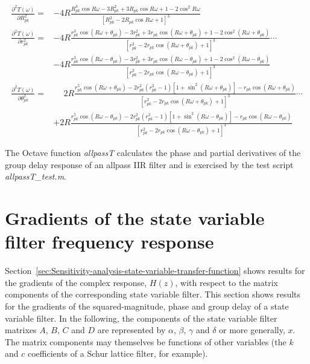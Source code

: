 \documentclass[a4paper,twoside,10pt,english]{report}
\begin{document}
\begin{align*}
\frac{\partial^{2} T\left(\omega\right)}{\partial R_{pk}^{2}} =&
-4R\frac{R_{pk}^{3}\cos R\omega-3R_{pk}^{2}+3R_{pk}\cos R\omega+1-2\cos^{2}R\omega}
{\left[R_{pk}^{2}-2R_{pk}\cos R\omega+1\right]^{3}}\\
\frac{\partial^{2} T\left(\omega\right)}{\partial r_{pk}^{2}} =&
-4R\frac{r_{pk}^{3}\cos\left(R\omega+\theta_{pk}\right)-3r_{pk}^{2}
+3r_{pk}\cos\left(R\omega+\theta_{pk}\right)
+1-2\cos^{2}\left(R\omega+\theta_{pk}\right)}
{\left[r_{pk}^{2}-2r_{pk}\cos\left(R\omega+\theta_{pk}\right)+1\right]^{3}}\cdots\\
&-4R\frac{r_{pk}^{3}\cos\left(R\omega-\theta_{pk}\right)-3r_{pk}^{2}
+3r_{pk}\cos\left(R\omega-\theta_{pk}\right)
+1-2\cos^{2}\left(R\omega-\theta_{pk}\right)}
{\left[r_{pk}^{2}-2r_{pk}\cos\left(R\omega-\theta_{pk}\right)+1\right]^{3}}\\
\frac{\partial^{2} T\left(\omega\right)}{\partial \theta_{pk}^{2}} =&
\phantom{+}2R\frac{r_{pk}^{5}\cos\left(R\omega+\theta_{pk}\right)
-2r_{pk}^{2}\left(r_{pk}^{2}-1\right)
\left[1+\sin^{2}\left(R\omega+\theta_{pk}\right)\right]
-r_{pk}\cos\left(R\omega+\theta_{pk}\right)}
{\left[r_{pk}^{2}-2r_{pk}\cos\left(R\omega+\theta_{pk}\right)+1\right]^{3}}\cdots\\
&+2R\frac{r_{pk}^{5}\cos\left(R\omega-\theta_{pk}\right)
-2r_{pk}^{2}\left(r_{pk}^{2}-1\right)
\left[1+\sin^{2}\left(R\omega-\theta_{pk}\right)\right]
-r_{pk}\cos\left(R\omega-\theta_{pk}\right)}
{\left[r_{pk}^{2}-2r_{pk}\cos\left(R\omega-\theta_{pk}\right)+1\right]^{3}}
\end{align*}

The Octave function \emph{allpassT} calculates the phase and partial derivatives
of the group delay response of an allpass IIR filter and is exercised by the 
test script \emph{allpassT\_test.m}.
\cleardoublepage{}
\chapter{\label{app:Gradients-state-variable-filter-frequency-response}Gradients of the state variable filter frequency response}
Section~\ref{sec:Sensitivity-analysis-state-variable-transfer-function} shows
results for the gradients of the complex response, $H\left(z\right)$, with
respect to the matrix components of the corresponding state variable filter.
This section shows results for the gradients of the squared-magnitude, phase and
group delay of a state variable filter. In the following, the components of
the state variable filter matrixes $A$, $B$, $C$ and $D$ are represented by
$\alpha$, $\beta$, $\gamma$ and $\delta$ or more generally, $x$. The matrix
components may themselves be functions of other variables (the 
$k$ and $c$ coefficients of a Schur lattice filter, for example).
\end{document}
